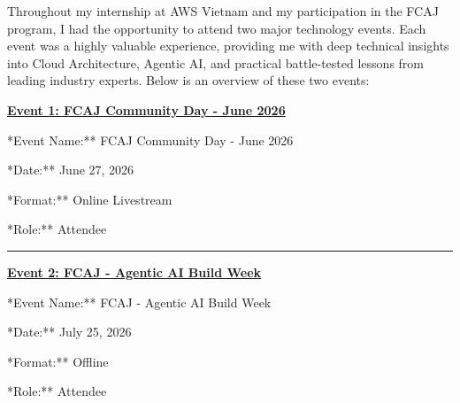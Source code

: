 Throughout my internship at AWS Vietnam and my participation in the FCAJ
program, I had the opportunity to attend two major technology events.
Each event was a highly valuable experience, providing me with deep
technical insights into Cloud Architecture, Agentic AI, and practical
battle-tested lessons from leading industry experts. Below is an
overview of these two events:

\vspace{0.5em}\noindent\textbf{\texorpdfstring{\href{4.1-Event1/}{Event 1: FCAJ
Community Day - June 2026}}{Event 1: FCAJ Community Day - June 2026}}

\qquad **Event Name:** FCAJ Community Day - June 2026

\qquad **Date:** June 27, 2026

\qquad **Format:** Online Livestream

\qquad **Role:** Attendee

\begin{center}\rule{0.5\linewidth}{0.5pt}\end{center}

\vspace{0.5em}\noindent\textbf{\texorpdfstring{\href{4.2-Event2/}{Event 2: FCAJ -
Agentic AI Build Week}}{Event 2: FCAJ - Agentic AI Build Week}}

\qquad **Event Name:** FCAJ - Agentic AI Build Week

\qquad **Date:** July 25, 2026

\qquad **Format:** Offline

\qquad **Role:** Attendee
